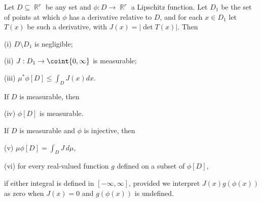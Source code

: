  Let $D\subseteq\BbbR^r$ be any set and
$\phi:D\to\BbbR^r$ a Lipschitz function.   Let $D_1$ be the set of
points at which $\phi$ has a derivative relative to $D$, and for each
$x\in D_1$ let $T(x)$ be such a derivative, with $J(x)=|\det T(x)|$.
Then

\quad (i) $D\setminus D_1$ is negligible;

\quad (ii) $J:D_1\to\coint{0,\infty}$ is measurable;

\quad (iii) $\mu^*\phi[D]\le\int_DJ(x)dx$.

\noindent If $D$ is measurable, then

\quad (iv) $\phi[D]$ is measurable.

\noindent If $D$ is measurable and $\phi$ is injective, then

\quad (v) $\mu\phi[D]=\int_DJ\,d\mu$,

\quad (vi) for every real-valued function $g$ defined on a subset of
$\phi[D]$,


\noindent if either integral is defined in $[-\infty,\infty]$, provided
we interpret $J(x)g(\phi(x))$ as zero when $J(x)=0$ and $g(\phi(x))$ is
undefined.


